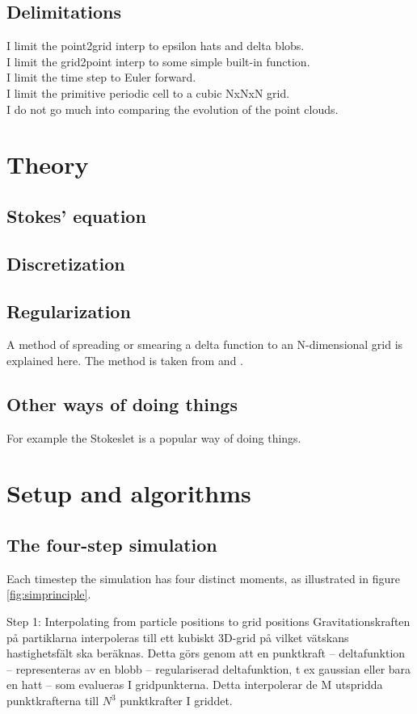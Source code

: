 \documentclass[a4paper,twoside=false,abstract=false,numbers=noenddot,
titlepage=false,headings=small,parskip=half,version=last]{scrartcl}
\begin{document}
\subsection{Delimitations}
I limit the point2grid interp to epsilon hats and delta blobs.\\
I limit the grid2point interp to some simple built-in function.\\
I limit the time step to Euler forward.\\
I limit the primitive periodic cell to a cubic NxNxN grid.\\
I do not go much into comparing the evolution of the point clouds.\\
\section{Theory}
\subsection{Stokes' equation}
\subsection{Discretization}
\subsection{Regularization}
A method of spreading or smearing a delta function to an N-dimensional grid is explained here. The method is taken from \cite{spectralewald} and \cite{interfaceregularization}.
\subsection{Other ways of doing things}
For example the Stokeslet is a popular way of doing things.

\section{Setup and algorithms}
\subsection{The four-step simulation}

Each timestep the simulation has four distinct moments, as illustrated in figure \ref{fig:simprinciple}.

Step 1: Interpolating from particle positions to grid positions
Gravitationskraften på partiklarna interpoleras till ett kubiskt 3D-grid på vilket vätskans hastighetsfält ska beräknas. Detta görs genom att en punktkraft – deltafunktion – representeras av en	 blobb – regulariserad deltafunktion, t ex gaussian eller bara en hatt – som evalueras I gridpunkterna. Detta interpolerar de M utspridda punktkrafterna till $N^3$ punktkrafter I griddet.
\end{document}

